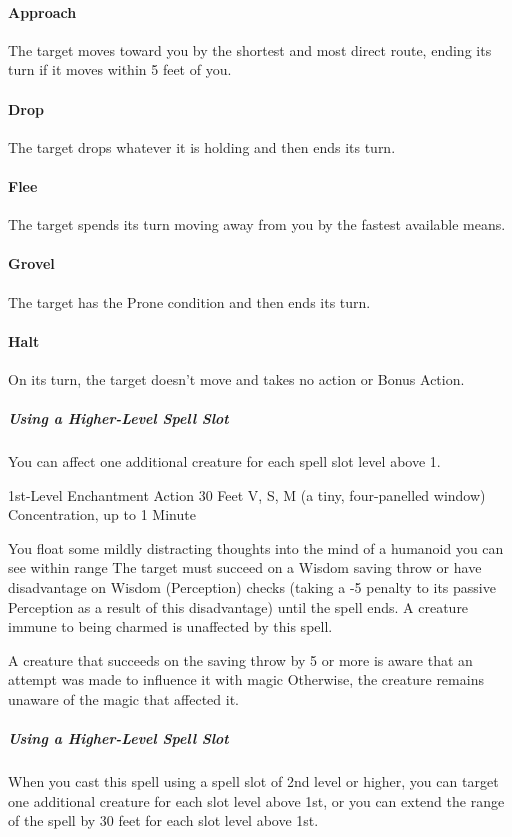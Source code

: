 \documentclass[letterpaper,openany,oneside,twocolumn]{book}
\begin{document}
\paragraph*{Approach} The target moves toward you by the shortest and most direct route, ending its turn if it moves within 5 feet of you.

\paragraph*{Drop} The target drops whatever it is holding and then ends its turn.

\paragraph*{Flee} The target spends its turn moving away from you by the fastest available means.

\paragraph*{Grovel} The target has the Prone condition and then ends its turn.

\paragraph*{Halt} On its turn, the target doesn't move and takes no action or Bonus Action.

\subparagraph*{Using a Higher-Level Spell Slot} You can affect one additional creature for each spell slot level above 1.

	{1st-Level Enchantment}
	{Action}
	{30 Feet}
	{V, S, M (a tiny, four-panelled window)}
	{Concentration, up to 1 Minute}

You float some mildly distracting thoughts into the mind of a humanoid you can see within range The target must succeed on a Wisdom saving throw or have disadvantage on Wisdom (Perception) checks (taking a -5 penalty to its passive Perception as a result of this disadvantage) until the spell ends. A creature immune to being charmed is unaffected by this spell.

A creature that succeeds on the saving throw by 5 or more is aware that an attempt was made to influence it with magic Otherwise, the creature remains unaware of the magic that affected it.

\subparagraph*{Using a Higher-Level Spell Slot} When you cast this spell using a spell slot of 2nd level or higher, you can target one additional creature for each slot level above 1st, or you can extend the range of the spell by 30 feet for each slot level above 1st.
\end{document}
